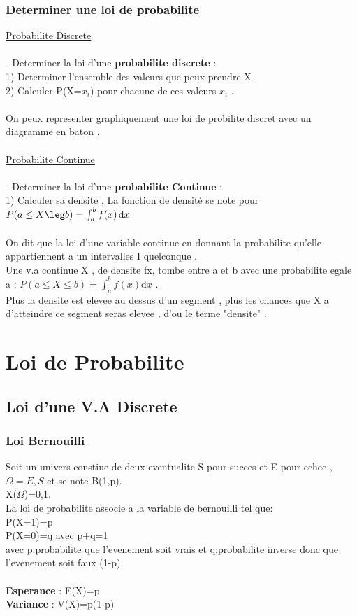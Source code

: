 \documentclass[a4paper,8pt,openany]{book}
\begin{document}
\subsection{Determiner une loi de probabilite}
\underline{Probabilite Discrete}\\
\\
- Determiner la loi d'une  \textbf{probabilite discrete} :\\
1) Determiner l'ensemble des valeurs que peux prendre X .\\
2) Calculer P(X=$x_i$) pour chacune de ces valeurs $x_i$ .\\
\\
On peux representer graphiquement une loi de probilite discret avec un diagramme en baton .\\
\\
\underline{Probabilite Continue}\\
\\
- Determiner la loi d'une  \textbf{probabilite Continue} :\\
1) Calculer sa densite , La fonction de densit\'e se note pour $P(a\leq X\leg b)=\int_a^b f(x) \, \mathrm dx$\\
\\
On dit que la loi d'une variable continue en donnant la probabilite qu'elle appartiennent a un intervalles I quelconque .\\
Une v.a continue X , de densite fx, tombe entre a et b avec une probabilite egale a : $P(a \le X \le b)=\int_a^b f(x) \mathrm dx$ .\\
Plus la densite est elevee au dessus d'un segment , plus les chances que X a d'atteindre ce segment seras elevee , d'ou le terme "densite" .\\


\chapter{Loi de Probabilite}
\section{Loi d'une V.A Discrete}

\subsection{Loi Bernouilli}

Soit un univers constiue de deux eventualite S pour succes et E pour echec , $\Omega ={E,S}$ et se note B(1,p).\\
X($\Omega$)={0,1}.\\
La loi de probabilite associe a la variable de bernouilli tel que:\\
P(X=1)=p\\
P(X=0)=q avec p+q=1\\ 
avec p:probabilite que l'evenement soit vrais et q:probabilite inverse donc que l'evenement soit faux (1-p).\\
\\
\textbf{Esperance} : E(X)=p\\
\textbf{Variance} : V(X)=p(1-p)\\ 
\end{document}
